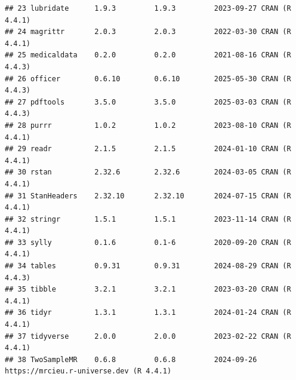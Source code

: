 \documentclass[
]{article}
\begin{document}
\begin{verbatim}
## 23 lubridate      1.9.3         1.9.3         2023-09-27 CRAN (R 4.4.1)                                
## 24 magrittr       2.0.3         2.0.3         2022-03-30 CRAN (R 4.4.1)                                
## 25 medicaldata    0.2.0         0.2.0         2021-08-16 CRAN (R 4.4.3)                                
## 26 officer        0.6.10        0.6.10        2025-05-30 CRAN (R 4.4.3)                                
## 27 pdftools       3.5.0         3.5.0         2025-03-03 CRAN (R 4.4.3)                                
## 28 purrr          1.0.2         1.0.2         2023-08-10 CRAN (R 4.4.1)                                
## 29 readr          2.1.5         2.1.5         2024-01-10 CRAN (R 4.4.1)                                
## 30 rstan          2.32.6        2.32.6        2024-03-05 CRAN (R 4.4.1)                                
## 31 StanHeaders    2.32.10       2.32.10       2024-07-15 CRAN (R 4.4.1)                                
## 32 stringr        1.5.1         1.5.1         2023-11-14 CRAN (R 4.4.1)                                
## 33 sylly          0.1.6         0.1-6         2020-09-20 CRAN (R 4.4.1)                                
## 34 tables         0.9.31        0.9.31        2024-08-29 CRAN (R 4.4.3)                                
## 35 tibble         3.2.1         3.2.1         2023-03-20 CRAN (R 4.4.1)                                
## 36 tidyr          1.3.1         1.3.1         2024-01-24 CRAN (R 4.4.1)                                
## 37 tidyverse      2.0.0         2.0.0         2023-02-22 CRAN (R 4.4.1)                                
## 38 TwoSampleMR    0.6.8         0.6.8         2024-09-26 https://mrcieu.r-universe.dev (R 4.4.1)
\end{verbatim}

\newpage
\end{document}
